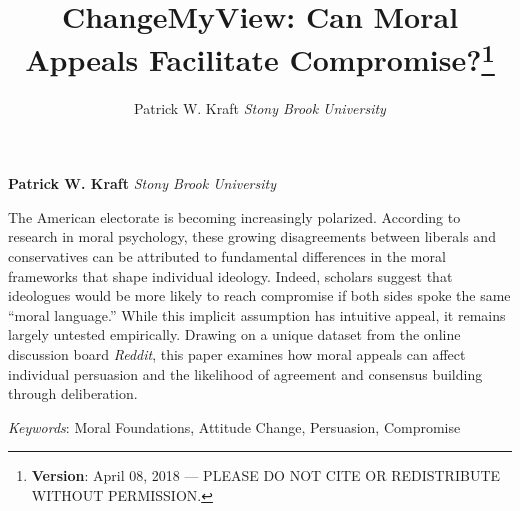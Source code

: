 \documentclass[12pt,]{article}
\title{ChangeMyView: Can Moral Appeals Facilitate Compromise?\thanks{\textbf{Version}: April 08, 2018 --- PLEASE DO NOT CITE OR REDISTRIBUTE
WITHOUT PERMISSION.}  }
\author{\Large Patrick W. Kraft\vspace{0.05in} \newline\normalsize\emph{Stony Brook University}  }
\date{}
\newcommand*{\authorfont}{\fontfamily{phv}\selectfont}
\renewenvironment{abstract}
 {{%
    \setlength{\leftmargin}{0mm}
    \setlength{\rightmargin}{\leftmargin}%
  }%
  \relax}
 {\endlist}
\begin{document}
	
%

{%
\setlength{\parindent}{0pt}
\thispagestyle{plain}
{\fontsize{18}{20}\selectfont\raggedright 
\maketitle  %

}

{
   \vskip 13.5pt\relax \normalsize\fontsize{11}{12} 
\textbf{\authorfont Patrick W. Kraft} \hskip 15pt \emph{\small Stony Brook University}   

}

}








\begin{abstract}

    \hbox{\vrule height .2pt width 39.14pc}

    \vskip 8.5pt %

\noindent The American electorate is becoming increasingly polarized. According to
research in moral psychology, these growing disagreements between
liberals and conservatives can be attributed to fundamental differences
in the moral frameworks that shape individual ideology. Indeed, scholars
suggest that ideologues would be more likely to reach compromise if both
sides spoke the same ``moral language.'' While this implicit assumption
has intuitive appeal, it remains largely untested empirically. Drawing
on a unique dataset from the online discussion board \emph{Reddit}, this
paper examines how moral appeals can affect individual persuasion and
the likelihood of agreement and consensus building through deliberation.


\vskip 8.5pt \noindent \emph{Keywords}: Moral Foundations, Attitude Change, Persuasion, Compromise \par

    \hbox{\vrule height .2pt width 39.14pc}



\end{abstract}


\vskip 6.5pt
\end{document}
